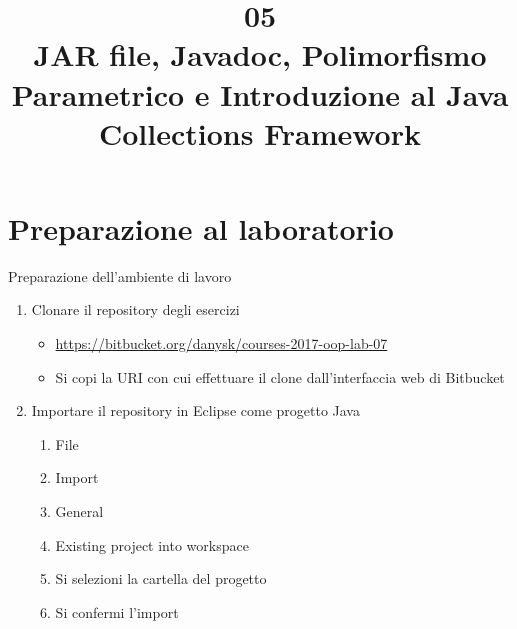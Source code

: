 \documentclass[presentation]{beamer}
\title[OOP05 -- Collections and Generics I]{05 \\JAR file, Javadoc, Polimorfismo Parametrico e Introduzione al Java Collections Framework}
\begin{document}
	
\frame[label=coverpage]{\titlepage}

\newcommand{\al}[0]{\textless}
\newcommand{\ar}[0]{\textgreater}
\newcommand{\gen}[1]{\al{}#1\ar{}}
\newcommand{\imgfr}[4]{\fr{#1}{#2
\begin{center}
\texttt{[image: \#4]}                    
\end{center}
}}


\section{Preparazione al laboratorio}

\begin{frame}{Preparazione dell'ambiente di lavoro}
	\begin{enumerate}
		\item Clonare il repository degli esercizi
		\begin{itemize}
			\item \url{https://bitbucket.org/danysk/courses-2017-oop-lab-07}
			\item Si copi la URI con cui effettuare il clone dall'interfaccia web di Bitbucket
		\end{itemize}
		\item Importare il repository in Eclipse come progetto Java
		\begin{enumerate}
			\item File
			\item Import
			\item General
			\item Existing project into workspace
			\item Si selezioni la cartella del progetto
			\item Si confermi l'import
		\end{enumerate}
	\end{enumerate}
\end{frame}
\end{document}
